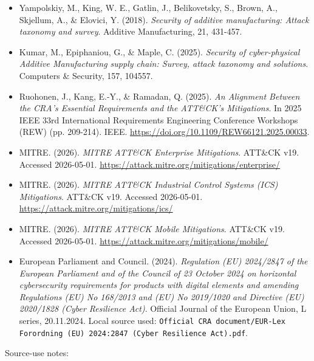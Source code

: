 \documentclass[10pt,a4paper,oneside]{report}
\begin{document}
\begin{itemize}
\item Yampolskiy, M., King, W. E., Gatlin, J., Belikovetsky, S., Brown, A., Skjellum, A., \& Elovici, Y. (2018). \emph{Security of additive manufacturing: Attack taxonomy and survey}. Additive Manufacturing, 21, 431-457.
\item Kumar, M., Epiphaniou, G., \& Maple, C. (2025). \emph{Security of cyber-physical Additive Manufacturing supply chain: Survey, attack taxonomy and solutions}. Computers \& Security, 157, 104557.
\item Ruohonen, J., Kang, E.-Y., \& Ramadan, Q. (2025). \emph{An Alignment Between the CRA's Essential Requirements and the ATT\&CK's Mitigations}. In 2025 IEEE 33rd International Requirements Engineering Conference Workshops (REW) (pp. 209-214). IEEE. \url{https://doi.org/10.1109/REW66121.2025.00033}.
\item MITRE. (2026). \emph{MITRE ATT\&CK Enterprise Mitigations}. ATT\&CK v19. Accessed 2026-05-01. \url{https://attack.mitre.org/mitigations/enterprise/}
\item MITRE. (2026). \emph{MITRE ATT\&CK Industrial Control Systems (ICS) Mitigations}. ATT\&CK v19. Accessed 2026-05-01. \url{https://attack.mitre.org/mitigations/ics/}
\item MITRE. (2026). \emph{MITRE ATT\&CK Mobile Mitigations}. ATT\&CK v19. Accessed 2026-05-01. \url{https://attack.mitre.org/mitigations/mobile/}
\item European Parliament and Council. (2024). \emph{Regulation (EU) 2024/2847 of the European Parliament and of the Council of 23 October 2024 on horizontal cybersecurity requirements for products with digital elements and amending Regulations (EU) No 168/2013 and (EU) No 2019/1020 and Directive (EU) 2020/1828 (Cyber Resilience Act)}. Official Journal of the European Union, L series, 20.11.2024. Local source used: \texttt{Official CRA document/EUR-Lex Forordning (EU) 2024:2847 (Cyber Resilience Act).pdf}.
\end{itemize}

Source-use notes:
\end{document}
